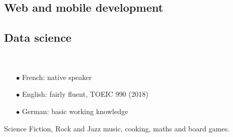 \documentclass{cv}
\begin{document}

\noindent\begin{minipage}[t]{0.6\textwidth}

\subsection*{Web and mobile development}

         

\end{minipage}\hspace{.5cm}
\begin{minipage}[t]{0.3\textwidth}

\subsection*{Data science}

   

\end{minipage}

\paragraph{}\,

\noindent\begin{minipage}[t]{0.6\textwidth}


\begin{itemize}
\setlength\itemsep{0pt}
\item[$\bullet$] French: native speaker
\item[$\bullet$] English: fairly fluent, TOEIC 990 (2018)
\item[$\bullet$] German: basic working knowledge
\end{itemize}

\end{minipage}\hspace{.5cm}
\begin{minipage}[t]{0.3\textwidth}


Science Fiction, Rock and Jazz music, cooking, maths and board games.

\end{minipage}
\end{document}
